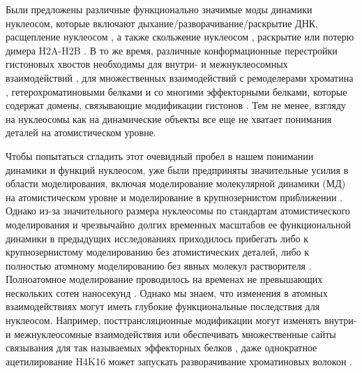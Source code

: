     Были предложены различные функционально значимые моды динамики нуклеосом, которые включают дыхание/разворачивание/раскрытие ДНК, расщепление нуклеосом \cite{zlatanova_nucleosome_2009}, а также скольжение нуклеосом \cite{mueller-planitz_nucleosome_2013}, раскрытие или потерю димера H2A-H2B \cite{shaytan_nucleosome_2015}. В то же время, различные конформационные перестройки гистоновых хвостов необходимы для внутри- и межнуклеосомных взаимодействий \cite{pepenella_intra-_2014}, для множественных взаимодействий с ремоделерами хроматина \cite{hwang_histone_2014,racki_histone_2014}, гетерохроматиновыми белками \cite{wang_heterochromatin_2013} и со многими эффекторными белками, которые содержат домены, связывающие модификации гистонов \cite{rando_combinatorial_2012}. Тем не менее, взгляду на нуклеосомы как на динамические объекты \cite{zlatanova_nucleosome_2009} все еще не хватает понимания деталей на атомистическом уровне.

    Чтобы попытаться сгладить этот очевидный пробел в нашем понимании динамики и функций нуклеосом, уже были предприняты значительные усилия в области моделирования, включая моделирование молекулярной динамики (МД) на атомистическом уровне \cite{biswas_atomistic_2013} и моделирование в крупнозернистом приближении \cite{arya_role_2006,collepardo-guevara_chromatin_2014}. Однако из-за значительного размера нуклеосомы по стандартам атомистического моделирования и чрезвычайно долгих временных масштабов ее функциональной динамики в предыдущих исследованиях приходилось прибегать либо к крупнозернистому моделированию без атомистических деталей, либо к полностью атомному моделированию без явных молекул растворителя \cite{erler_role_2014}. Полноатомное моделирование проводилось на временах не превышающих нескольких сотен наносекунд \cite{materese_counterion_2009,ruscio_computational_2006}. Однако мы знаем, что изменения в атомных взаимодействиях могут иметь глубокие функциональные последствия для нуклеосом. Например, посттрансляционные модификации могут изменять внутри- и межнуклеосомные взаимодействия или обеспечивать множественные сайты связывания для так называемых эффекторных белков \cite{ruthenburg_multivalent_2007}, даже однократное ацетилирование H4K16 может запускать разворачивание хроматиновых волокон \cite{dorigo_chromatin_2003,norouzi_topological_2015-1}.

